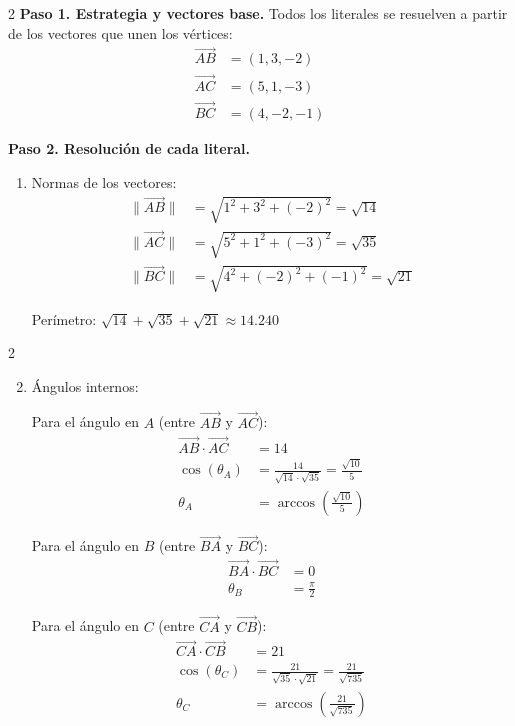 \begin{example}
\begin{myproof}
\begin{multicols}{2}
\textbf{Paso 1. Estrategia y vectores base.} Todos los literales se resuelven a partir de los vectores que unen los vértices:
\begin{align*}
\overrightarrow{AB} &= (1, 3, -2) \\
\overrightarrow{AC} &= (5, 1, -3) \\
\overrightarrow{BC} &= (4, -2, -1)
\end{align*}

\textbf{Paso 2. Resolución de cada literal.}
\begin{enumerate}[$(a)$]
\item Normas de los vectores:
\begin{align*}
\|\overrightarrow{AB}\| &= \sqrt{1^2 + 3^2 + (-2)^2} = \sqrt{14} \\
\|\overrightarrow{AC}\| &= \sqrt{5^2 + 1^2 + (-3)^2} = \sqrt{35} \\
\|\overrightarrow{BC}\| &= \sqrt{4^2 + (-2)^2 + (-1)^2} = \sqrt{21}
\end{align*}

Perímetro: $\boxed{\sqrt{14} + \sqrt{35} + \sqrt{21}} \approx 14.240$
\end{enumerate}
\end{multicols}
\begin{multicols}{2}
\begin{enumerate}[$(a)$]
\setcounter{enumi}{1}
\item Ángulos internos:

Para el ángulo en $A$ (entre $\overrightarrow{AB}$ y $\overrightarrow{AC}$):
\begin{align*}
\overrightarrow{AB} \cdot \overrightarrow{AC} &=  14 \\
\cos(\theta_A) &= \frac{14}{\sqrt{14} \cdot \sqrt{35}} = \frac{\sqrt{10}}{5} \\
\theta_A &= \boxed{\arccos\left(\frac{\sqrt{10}}{5}\right)}
\end{align*}

Para el ángulo en $B$ (entre $\overrightarrow{BA}$ y $\overrightarrow{BC}$):
\begin{align*}
\overrightarrow{BA} \cdot \overrightarrow{BC} &= 0 \\
\theta_B &= \boxed{\frac{\pi}{2}}
\end{align*}

Para el ángulo en $C$ (entre $\overrightarrow{CA}$ y $\overrightarrow{CB}$):
\begin{align*}
\overrightarrow{CA} \cdot \overrightarrow{CB} &=  21 \\
\cos(\theta_C) &= \frac{21}{\sqrt{35} \cdot \sqrt{21}} = \frac{21}{\sqrt{735}} \\
\theta_C &= \boxed{\arccos\left(\frac{21}{\sqrt{735}}\right)}
\end{align*}


\end{enumerate}
\end{multicols}
\end{myproof}
\end{example}
